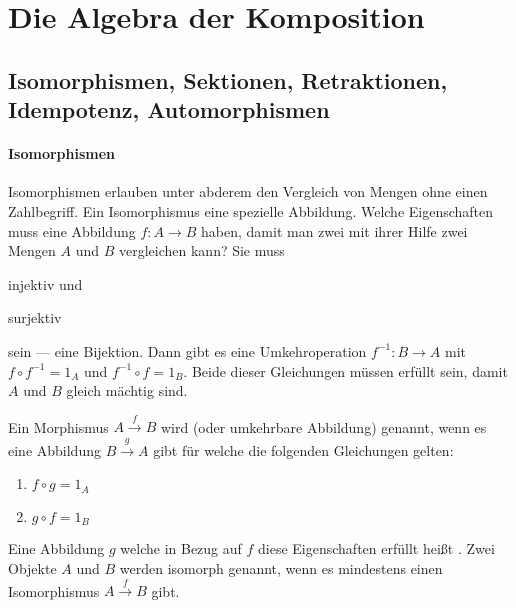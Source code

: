 \documentclass[parskip=half]{scrreprt}
\begin{document}
\part{Die Algebra der Komposition}


\chapter{Isomorphismen, Sektionen, Retraktionen, Idempotenz, Automorphismen}

\subsection{Isomorphismen}

\begin{example}
Isomorphismen erlauben unter abderem den Vergleich von Mengen ohne einen Zahlbegriff.
Ein Isomorphismus eine spezielle Abbildung. Welche Eigenschaften muss eine 
Abbildung $f: A → B$ haben, damit man zwei mit ihrer Hilfe zwei Mengen $A$ und 
$B$ vergleichen kann? Sie muss 
\begin{enumerate*}
\item injektiv und 
\item surjektiv 
\end{enumerate*}
sein --- eine Bijektion. Dann gibt es eine Umkehroperation $f^{-1}: B → A$ 
mit $f ∘ f^{-1} = 1_A$ und $f^{-1} ∘ f = 1_B$.
Beide dieser Gleichungen müssen erfüllt sein, damit $A$ und $B$ gleich mächtig
sind.
\end{example}


\begin{definition}[Isomorphismus]
Ein Morphismus $A \xrightarrow{f} B$ wird  
(oder umkehrbare Abbildung) genannt, wenn es eine Abbildung $B \xrightarrow{g} A$ 
gibt für welche die folgenden Gleichungen gelten:
\begin{enumerate}
\item $f ∘ g = 1_A$
\item $g ∘ f = 1_B$
\end{enumerate}
Eine Abbildung $g$ welche in Bezug auf $f$ diese Eigenschaften erfüllt heißt 
. Zwei Objekte $A$ und $B$ werden isomorph genannt,
wenn es mindestens einen Isomorphismus $A \xrightarrow{f} B$ gibt.
\end{definition}
\end{document}
